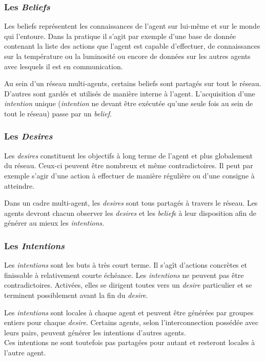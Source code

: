 \documentclass[11pt]{book}
\begin{document}
\subsubsection{Les \textit{Beliefs}}
Les beliefs représentent les connaissances de l'agent sur lui-même et sur le 
monde qui l’entoure. Dans la pratique il s'agit par exemple d'une base de 
donnée contenant la liste des actions que l'agent est capable d'effectuer, 
de connaissances sur la température ou la luminosité ou encore de 
données sur les autres agents avec lesquels il est en communication.

Au sein d'un réseau multi-agents, certains beliefs sont partagés sur tout le
réseau. D'autres sont gardés et utilisés de manière interne à l'agent. 
L'acquisition d'une \textit{intention} unique (\textit{intention} ne devant 
être exécutée qu'une seule fois au sein de tout le réseau) passe par un 
\textit{belief}.

\subsubsection{Les \textit{Desires}}
Les \textit{desires} constituent les objectifs à long terme de l'agent et 
plus globalement du réseau. Ceux-ci peuvent être nombreux et même 
contradictoires. Il peut par exemple s'agir d'une action à effectuer de 
manière régulière ou d'une consigne à atteindre.

Dans un cadre multi-agent, les \textit{desires} sont tous partagés à travers 
le réseau. Les agents devront chacun observer les \textit{desires} et les 
\textit{belief}s à leur disposition afin de générer au mieux les 
\textit{intentions}\cite{astington1991developing}. 

\subsubsection{Les \textit{Intentions}}
Les \textit{intentions} sont les buts à très court terme. Il s'agît 
d'actions concrètes et finissable à relativement courte échéance. 
Les \textit{intentions} ne peuvent pas être contradictoires. Activées, elles 
se dirigent toutes vers un \textit{desire} particulier et se terminent 
possiblement avant la fin du \textit{desire}.

Les \textit{intentions} sont locales à chaque agent et peuvent être générées 
par groupes entiers pour chaque \textit{desire}. Certains agents, selon 
l'interconnection possédée avec leurs pairs, peuvent générer les 
intentions d'autres agents.\\
Ces intentions ne sont toutefois pas partagées pour autant et resteront 
locales à l'autre agent.
\end{document}
